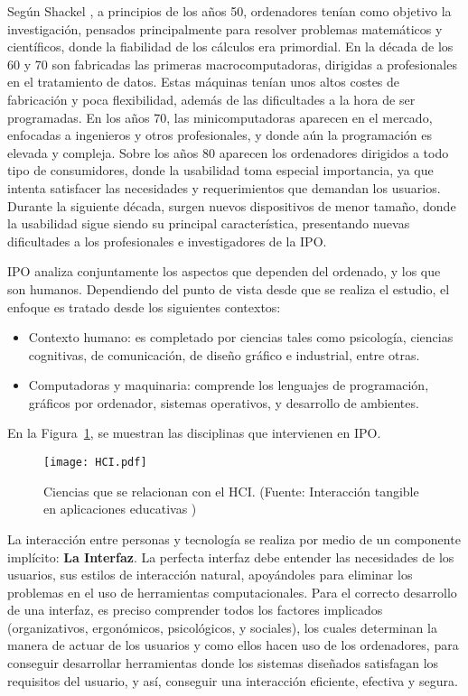 Según Shackel \cite{Shackel}, a principios de los años 50, ordenadores tenían como objetivo la investigación, pensados principalmente para resolver problemas matemáticos y científicos, donde la fiabilidad de los cálculos era primordial. En la década de los 60 y 70 son fabricadas las primeras macrocomputadoras, dirigidas a profesionales en el tratamiento de datos. Estas máquinas tenían unos altos costes de fabricación y poca flexibilidad, además de las dificultades a la hora de ser programadas. En los años 70, las minicomputadoras aparecen en el mercado, enfocadas a ingenieros y otros profesionales, y donde aún la programación es elevada y compleja. Sobre los años 80 aparecen los ordenadores dirigidos a todo tipo de consumidores, donde la usabilidad toma especial importancia, ya que intenta satisfacer las necesidades y requerimientos que demandan los usuarios. Durante la siguiente década, surgen nuevos dispositivos de menor tamaño, donde la usabilidad sigue siendo su principal característica, presentando nuevas dificultades a los profesionales e investigadores de la IPO.

IPO analiza conjuntamente los aspectos que dependen del ordenado, y los que son humanos. Dependiendo del punto de vista desde que se realiza el estudio, el enfoque es tratado desde los siguientes contextos:
\begin{itemize}
\item Contexto humano: es completado por ciencias tales como psicología, ciencias cognitivas, de comunicación, de diseño gráfico e industrial, entre otras.
\item Computadoras y maquinaria: comprende los lenguajes de programación, gráficos por ordenador, sistemas operativos, y desarrollo de ambientes.
\end{itemize}

En la Figura~\ref{fig:HCI}, se muestran las disciplinas que intervienen en IPO.

\begin{figure}[!h]
\begin{center}
\texttt{[image: HCI.pdf]}
\caption{Ciencias que se relacionan con el HCI. (Fuente: Interacción tangible en aplicaciones educativas \cite{Artola})}
\label{fig:HCI}
\end{center}
\end{figure}

La interacción entre personas y tecnología se realiza por medio de un componente implícito: \textbf{La Interfaz}.
La perfecta interfaz debe entender las necesidades de los usuarios, sus estilos de interacción natural, apoyándoles para eliminar los problemas en el uso de herramientas computacionales. Para el correcto desarrollo de una interfaz, es preciso comprender todos los factores implicados (organizativos, ergonómicos, psicológicos, y sociales), los cuales determinan la manera de actuar de los usuarios y como ellos hacen uso de los ordenadores, para conseguir desarrollar herramientas donde los sistemas diseñados satisfagan los requisitos del usuario, y así, conseguir una interacción eficiente, efectiva y segura.


